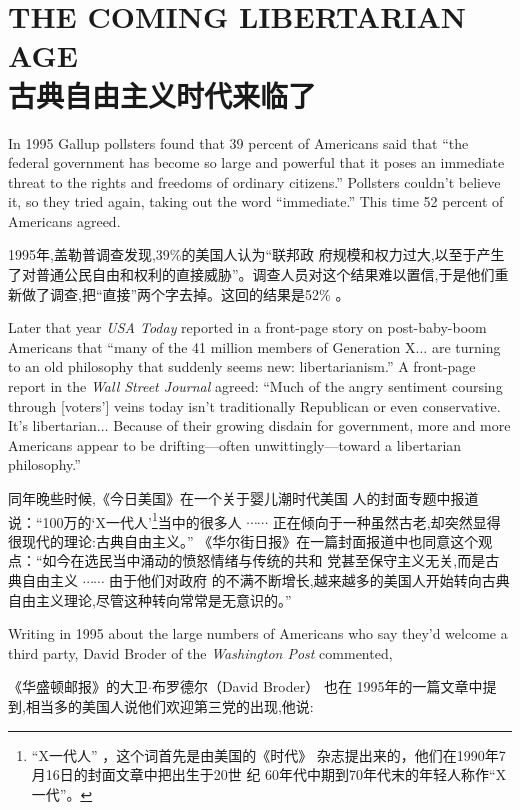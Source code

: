 \chapter{THE COMING LIBERTARIAN AGE \\古典自由主义时代来临了}
\begin{paracol}{2}

In 1995 Gallup pollsters found that 39 percent of Americans said that ``the federal government has become so large and powerful that it poses an immediate threat to the rights and freedoms of ordinary citizens.'' Pollsters couldn't believe it, so they tried again, taking out the word ``immediate.'' This time 52 percent of Americans agreed.

\switchcolumn
1995年,盖勒普调查发现,39\%的美国人认为“联邦政 府规模和权力过大,以至于产生了对普通公民自由和权利的直接威胁”。调查人员对这个结果难以置信,于是他们重新做了调查,把“直接”两个字去掉。这回的结果是52\% 。

\switchcolumn*
Later that year \textit{USA Today} reported in a front-page story on
post-baby-boom Americans that ``many of the 41 million members of Generation X$\ldots$ are turning to an old philosophy that suddenly seems new: libertarianism.'' A front-page report in the \textit{Wall Street Journal} agreed: ``Much of the angry sentiment coursing through [voters'] veins today isn't traditionally Republican or even conservative. It's libertarian$\ldots$ Because of their growing disdain for government, more and more Americans appear to be drifting---often unwittingly---toward a libertarian philosophy.''

\switchcolumn
同年晚些时候,《今日美国》在一个关于婴儿潮时代美国 人的封面专题中报道说：“100万的‘X一代人’\footnote{“X一代人” ，这个词首先是由美国的《时代》 杂志提出来的，他们在1990年7月16日的封面文章中把出生于20世 纪 60年代中期到70年代末的年轻人称作“X一代”。}当中的很多人 $\cdots \cdots$ 正在倾向于一种虽然古老,却突然显得很现代的理论:古典自由主义。” 《华尔街日报》在一篇封面报道中也同意这个观点：“如今在选民当中涌动的愤怒情绪与传统的共和 党甚至保守主义无关,而是古典自由主义 $\cdots \cdots$ 由于他们对政府 的不满不断增长,越来越多的美国人开始转向古典自由主义理论,尽管这种转向常常是无意识的。”

\switchcolumn*
Writing in 1995 about the large numbers of Americans who say they'd welcome a third party, David Broder of the \textit{Washington Post} commented,

\switchcolumn
《华盛顿邮报》的大卫$\cdot$布罗德尔（David Broder） 也在 1995年的一篇文章中提到,相当多的美国人说他们欢迎第三党的出现,他说:


\end{paracol}

